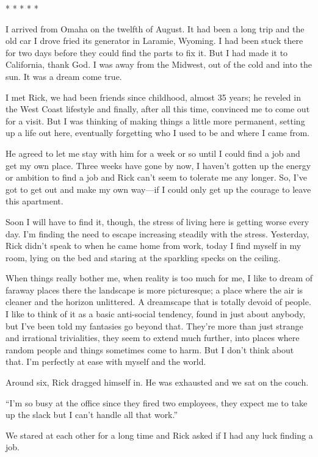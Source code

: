 \documentclass[
]{article}
\begin{document}
* * * * *

I arrived from Omaha on the twelfth of August. It had been a long trip
and the old car I drove fried its generator in Laramie, Wyoming. I had
been stuck there for two days before they could find the parts to fix
it. But I had made it to California, thank God. I was away from the
Midwest, out of the cold and into the sun. It was a dream come true.

I met Rick, we had been friends since childhood, almost 35 years; he
reveled in the West Coast lifestyle and finally, after all this time,
convinced me to come out for a visit. But I was thinking of making
things a little more permanent, setting up a life out here, eventually
forgetting who I used to be and where I came from.

He agreed to let me stay with him for a week or so until I could find a
job and get my own place. Three weeks have gone by now, I haven't gotten
up the energy or ambition to find a job and Rick can't seem to tolerate
me any longer. So, I've got to get out and make my own way---if I could
only get up the courage to leave this apartment.

Soon I will have to find it, though, the stress of living here is
getting worse every day. I'm finding the need to escape increasing
steadily with the stress. Yesterday, Rick didn't speak to when he came
home from work, today I find myself in my room, lying on the bed and
staring at the sparkling specks on the ceiling.

When things really bother me, when reality is too much for me, I like to
dream of faraway places there the landscape is more picturesque; a place
where the air is cleaner and the horizon unlittered. A dreamscape that
is totally devoid of people. I like to think of it as a basic
anti-social tendency, found in just about anybody, but I've been told my
fantasies go beyond that. They're more than just strange and irrational
trivialities, they seem to extend much further, into places where random
people and things sometimes come to harm. But I don't think about that.
I'm perfectly at ease with myself and the world.

Around six, Rick dragged himself in. He was exhausted and we sat on the
couch.

``I'm so busy at the office since they fired two employees, they expect
me to take up the slack but I can't handle all that work.''

We stared at each other for a long time and Rick asked if I had any luck
finding a job.
\end{document}
